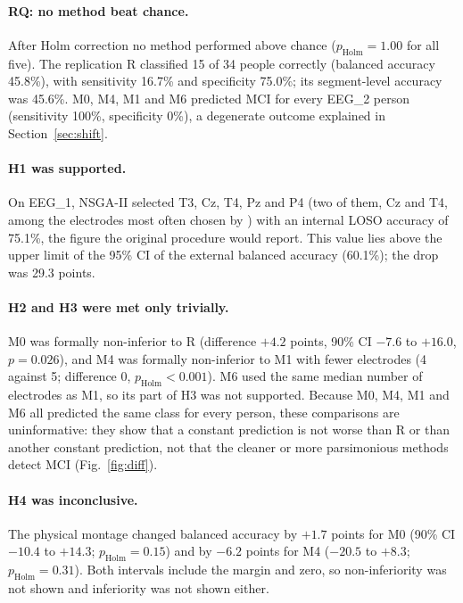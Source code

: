\paragraph{RQ: no method beat chance.} After Holm correction no method performed above chance ($p_\text{Holm}=1.00$ for all five). The replication R classified 15 of 34 people correctly (balanced accuracy 45.8\%), with sensitivity 16.7\% and specificity 75.0\%; its segment-level accuracy was 45.6\%. M0, M4, M1 and M6 predicted MCI for every EEG\_2 person (sensitivity 100\%, specificity 0\%), a degenerate outcome explained in Section~\ref{sec:shift}.

\paragraph{H1 was supported.} On EEG\_1, NSGA-II selected T3, Cz, T4, Pz and P4 (two of them, Cz and T4, among the electrodes most often chosen by \citealp{aljalal2024}) with an internal LOSO accuracy of 75.1\%, the figure the original procedure would report. This value lies above the upper limit of the 95\% CI of the external balanced accuracy (60.1\%); the drop was 29.3 points.

\paragraph{H2 and H3 were met only trivially.} M0 was formally non-inferior to R (difference $+4.2$ points, 90\% CI $-7.6$ to $+16.0$, $p=0.026$), and M4 was formally non-inferior to M1 with fewer electrodes (4 against 5; difference 0, $p_\text{Holm}<0.001$). M6 used the same median number of electrodes as M1, so its part of H3 was not supported. Because M0, M4, M1 and M6 all predicted the same class for every person, these comparisons are uninformative: they show that a constant prediction is not worse than R or than another constant prediction, not that the cleaner or more parsimonious methods detect MCI (Fig.~\ref{fig:diff}).

\paragraph{H4 was inconclusive.} The physical montage changed balanced accuracy by $+1.7$ points for M0 (90\% CI $-10.4$ to $+14.3$; $p_\text{Holm}=0.15$) and by $-6.2$ points for M4 ($-20.5$ to $+8.3$; $p_\text{Holm}=0.31$). Both intervals include the margin and zero, so non-inferiority was not shown and inferiority was not shown either.

